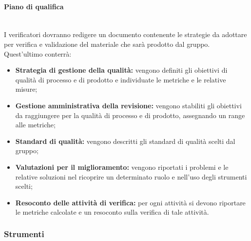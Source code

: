 \paragraph{Piano di qualifica} \mbox{}\\
I verificatori dovranno redigere un documento contenente le strategie da adottare per verifica e validazione del materiale che sarà prodotto dal gruppo. Quest'ultimo conterrà:
\begin{itemize}
	\item \textbf{Strategia di gestione della qualità:} vengono definiti gli obiettivi di qualità di processo e di prodotto e individuate le metriche e le relative misure;
	\item \textbf{Gestione amministrativa della revisione:} vengono stabiliti gli obiettivi da raggiungere per la qualità di processo e di prodotto, assegnando un range alle metriche;
	\item \textbf{Standard di qualità:} vengono descritti gli standard di qualità scelti dal gruppo;
	\item \textbf{Valutazioni per il miglioramento:} vengono riportati i problemi e le relative soluzioni nel ricoprire un determinato ruolo e nell'uso degli strumenti scelti;
	\item \textbf{Resoconto delle attività di verifica:} per ogni attività si devono riportare le metriche calcolate e un resoconto sulla verifica di tale attività.
\end{itemize}
\subsubsection{Strumenti}

        
